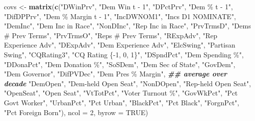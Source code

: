 \documentclass[
  12pt,
  leqno]{article}
\newenvironment{Shaded}{\begin{snugshade}}{\end{snugshade}}
\newcommand{\AttributeTok}[1]{\textcolor[rgb]{0.13,0.29,0.53}{#1}}
\newcommand{\ConstantTok}[1]{\textcolor[rgb]{0.56,0.35,0.01}{#1}}
\newcommand{\DecValTok}[1]{\textcolor[rgb]{0.00,0.00,0.81}{#1}}
\newcommand{\DocumentationTok}[1]{\textcolor[rgb]{0.56,0.35,0.01}{\textbf{\textit{#1}}}}
\newcommand{\FunctionTok}[1]{\textcolor[rgb]{0.13,0.29,0.53}{\textbf{#1}}}
\newcommand{\NormalTok}[1]{#1}
\newcommand{\OtherTok}[1]{\textcolor[rgb]{0.56,0.35,0.01}{#1}}
\newcommand{\StringTok}[1]{\textcolor[rgb]{0.31,0.60,0.02}{#1}}
\begin{document}
\begin{Shaded}
\begin{Highlighting}[]
\NormalTok{covs }\OtherTok{\textless{}{-}} \FunctionTok{matrix}\NormalTok{(}\FunctionTok{c}\NormalTok{(}\StringTok{"DWinPrv"}\NormalTok{, }\StringTok{"Dem Win t {-} 1"}\NormalTok{,}
                 \StringTok{"DPctPrv"}\NormalTok{, }\StringTok{"Dem \% t {-} 1"}\NormalTok{,}
                 \StringTok{"DifDPPrv"}\NormalTok{, }\StringTok{"Dem \% Margin t {-} 1"}\NormalTok{,}
                 \StringTok{"IncDWNOM1"}\NormalTok{, }\StringTok{"Inc\textquotesingle{}s D1 NOMINATE"}\NormalTok{,}
                 \StringTok{"DemInc"}\NormalTok{, }\StringTok{"Dem Inc in Race"}\NormalTok{,}
                 \StringTok{"NonDInc"}\NormalTok{, }\StringTok{"Rep Inc in Race"}\NormalTok{,}
                 \StringTok{"PrvTrmsD"}\NormalTok{, }\StringTok{"Dem\textquotesingle{}s \# Prev Terms"}\NormalTok{,}
                 \StringTok{"PrvTrmsO"}\NormalTok{, }\StringTok{"Rep\textquotesingle{}s \# Prev Terms"}\NormalTok{,}
                 \StringTok{"RExpAdv"}\NormalTok{, }\StringTok{"Rep Experience Adv"}\NormalTok{,}
                 \StringTok{"DExpAdv"}\NormalTok{, }\StringTok{"Dem Experience Adv"}\NormalTok{,}
                 \StringTok{"ElcSwing"}\NormalTok{, }\StringTok{"Partisan Swing"}\NormalTok{,}
                 \StringTok{"CQRating3"}\NormalTok{, }\StringTok{"CQ Rating \{{-}1, 0, 1\}"}\NormalTok{,}
                 \StringTok{"DSpndPct"}\NormalTok{, }\StringTok{"Dem Spending \%"}\NormalTok{,}
                 \StringTok{"DDonaPct"}\NormalTok{, }\StringTok{"Dem Donation \%"}\NormalTok{,}
                 \StringTok{"SoSDem"}\NormalTok{, }\StringTok{"Dem Sec of State"}\NormalTok{,}
                 \StringTok{"GovDem"}\NormalTok{, }\StringTok{"Dem Governor"}\NormalTok{,}
                 \StringTok{"DifPVDec"}\NormalTok{, }\StringTok{"Dem Pres \% Margin"}\NormalTok{, }\DocumentationTok{\#\# average over decade}
                 \StringTok{"DemOpen"}\NormalTok{, }\StringTok{"Dem{-}held Open Seat"}\NormalTok{,}
                 \StringTok{"NonDOpen"}\NormalTok{, }\StringTok{"Rep{-}held Open Seat"}\NormalTok{,}
                 \StringTok{"OpenSeat"}\NormalTok{, }\StringTok{"Open Seat"}\NormalTok{,}
                 \StringTok{"VtTotPct"}\NormalTok{, }\StringTok{"Voter Turnout \%"}\NormalTok{,}
                 \StringTok{"GovWkPct"}\NormalTok{, }\StringTok{"Pct Gov\textquotesingle{}t Worker"}\NormalTok{,}
                 \StringTok{"UrbanPct"}\NormalTok{, }\StringTok{"Pct Urban"}\NormalTok{,}
                 \StringTok{"BlackPct"}\NormalTok{, }\StringTok{"Pct Black"}\NormalTok{,}
                 \StringTok{"ForgnPct"}\NormalTok{, }\StringTok{"Pct Foreign Born"}\NormalTok{),}
               \AttributeTok{ncol =} \DecValTok{2}\NormalTok{,}
               \AttributeTok{byrow =} \ConstantTok{TRUE}\NormalTok{)}


\end{Highlighting}
\end{Shaded}
\end{document}
